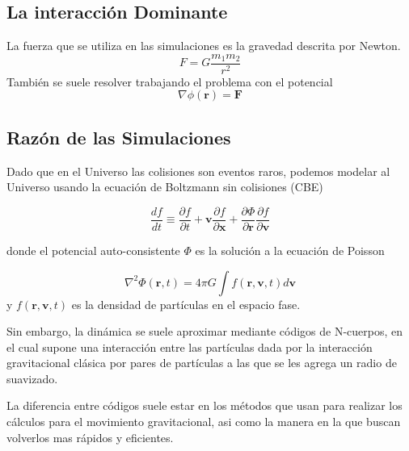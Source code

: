\documentclass{beamer}
\begin{document}
\subsection[La interacción dominante en las simulaciones]{La interacción Dominante}
	\begin{frame}
		La fuerza que se utiliza en las simulaciones es la gravedad descrita por Newton.
		\begin{equation}
		    F = G \frac{m_1 m_2}{r^2}
		    \label{eq:Gravedad-Newton}
		\end{equation}
		También se suele resolver trabajando el problema con el potencial
		\begin{equation}
		    \nabla \phi(\mathbf{r}) = \mathbf{F}
		    \label{eq:potencial-gravitacional}
		\end{equation}
	\end{frame}
	

\subsection[Una razón práctica para las simulaciones]{Razón de las Simulaciones}

	\begin{frame}
		Dado que en el Universo las colisiones son eventos raros, podemos modelar al Universo usando la  ecuación de Boltzmann sin colisiones (CBE)
	
		
		\begin{equation}
		    \frac{d f}{d t} \equiv \frac{\partial f}{\partial t} + \mathbf{v}\frac{\partial f}{\partial \mathbf{x}} + \frac{\partial \Phi}{\partial \mathbf{r}} \frac{\partial f}{\partial \mathbf{v}}
		    \label{eq:CBE}
		\end{equation}

		donde el potencial auto-consistente $\Phi$ es la solución a la ecuación de Poisson

		\begin{equation}
		    \nabla^2\Phi(\mathbf{r},t) = 4\pi G \int f(\mathbf{r},\mathbf{v},t)d\mathbf{v}
		    \label{eq:PoissonSol}
		\end{equation}
		\noindent y $f(\mathbf{r},\mathbf{v},t)$ es la densidad de partículas en el espacio fase.
	\end{frame}
	
	\begin{frame}
		Sin embargo, la dinámica se suele aproximar mediante códigos de N-cuerpos, en el cual supone una interacción entre las partículas dada por la interacción gravitacional clásica por pares de partículas a las que se les agrega un radio de suavizado.

		 La diferencia entre códigos suele estar en los métodos que usan para realizar los cálculos para el movimiento gravitacional, asi como la manera en la que buscan volverlos mas rápidos y eficientes.

	\end{frame}
\end{document}
